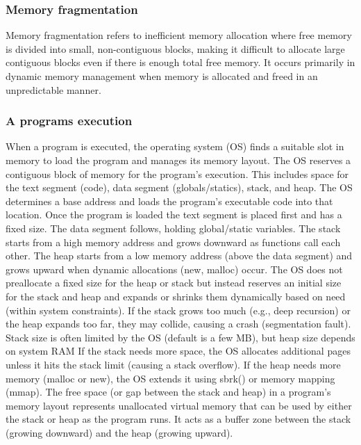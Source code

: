 \documentclass{report}
\begin{document}
\bigbreak \noindent 
\subsubsection{Memory fragmentation}
\bigbreak \noindent 
Memory fragmentation refers to inefficient memory allocation where free memory is divided into small, non-contiguous blocks, making it difficult to allocate large contiguous blocks even if there is enough total free memory. It occurs primarily in dynamic memory management when memory is allocated and freed in an unpredictable manner.

\bigbreak \noindent 
\subsubsection{A programs execution}
\bigbreak \noindent 
When a program is executed, the operating system (OS) finds a suitable slot in memory to load the program and manages its memory layout.
\bigbreak \noindent 
The OS reserves a contiguous block of memory for the program's execution. This includes space for the text segment (code), data segment (globals/statics), stack, and heap.
\bigbreak \noindent 
The OS determines a base address and loads the program's executable code into that location.
\bigbreak \noindent 
Once the program is loaded the text segment is placed first and has a fixed size.
\bigbreak \noindent 
The data segment follows, holding global/static variables.
\bigbreak \noindent 
The stack starts from a high memory address and grows downward as functions call each other.
\bigbreak \noindent 
The heap starts from a low memory address (above the data segment) and grows upward when dynamic allocations (new, malloc) occur.
\bigbreak \noindent 
The OS does not preallocate a fixed size for the heap or stack but instead reserves an initial size for the stack and heap and expands or shrinks them dynamically based on need (within system constraints).
\bigbreak \noindent 
If the stack grows too much (e.g., deep recursion) or the heap expands too far, they may collide, causing a crash (segmentation fault).
\bigbreak \noindent 
Stack size is often limited by the OS (default is a few MB), but heap size depends on system RAM
\bigbreak \noindent 
If the stack needs more space, the OS allocates additional pages unless it hits the stack limit (causing a stack overflow).
\bigbreak \noindent 
 If the heap needs more memory (malloc or new), the OS extends it using sbrk() or memory mapping (mmap).
 \bigbreak \noindent 
 \bigbreak \noindent 
 The free space (or gap between the stack and heap) in a program's memory layout represents unallocated virtual memory that can be used by either the stack or heap as the program runs.
 \bigbreak \noindent 
 It acts as a buffer zone between the stack (growing downward) and the heap (growing upward).
\end{document}
